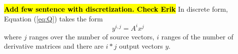 \documentclass[10pt,conference,compsocconf]{IEEEtran}
\def\ttt#1{{\tt #1}}
\newcommand{\todo}[1]{{\color{red}\textbf{\hl{#1}}\xspace}}
\begin{document}
\todo{Add few sentence with discretization. Check Erik}
In discrete form, Equation (\ref{eq:Q}) takes the form
$$
  y^{i,j} = A^i x^j 
$$
where $j$ ranges over the number of source vectors, $i$ ranges of the number of derivative
matrices and there are $i*j$ output vectors $y$. 




%
%
%
%
%
\end{document}
